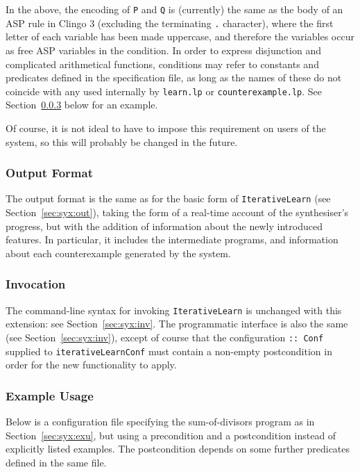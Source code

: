 \documentclass[a4paper,twoside,notitlepage,12pt]{article}
\begin{document}
In the above, the encoding of \verb|P| and \verb|Q| is (currently) the same as the body of an ASP rule in Clingo 3 (excluding the terminating 
\verb|.| character), where the first letter of each variable has been made uppercase, and therefore the variables occur as free ASP variables 
in the condition. In order to express disjunction and complicated arithmetical functions, conditions may refer to constants and predicates 
defined in the specification file, as long as the names of these do not coincide with any used internally by \verb|learn.lp| or 
\verb|counterexample.lp|. See Section~\ref{sec:gnx:exu} below for an example.

Of course, it is not ideal to have to impose this requirement on users of the system, so this will probably be changed in the future.

\subsubsection{Output Format} \label{sec:gnx:out}

The output format is the same as for the basic form of \verb|IterativeLearn| (see Section~\ref{sec:syx:out}), taking the form of a 
real-time account of the synthesiser's progress, but with the addition of information about the newly introduced features. In particular, it
includes the intermediate programs, and information about each counterexample generated by the system.

\subsubsection{Invocation} \label{sec:gnx:inv}

The command-line syntax for invoking \verb|IterativeLearn| is unchanged with this extension: see Section~\ref{sec:syx:inv}. The programmatic 
interface is also the same (see Section~\ref{sec:syx:inv}), except of course that the configuration \verb|:: Conf| supplied to 
\verb|iterativeLearnConf| must contain a non-empty postcondition in order for the new functionality to apply.

\subsubsection{Example Usage} \label{sec:gnx:exu}

Below is a configuration file specifying the sum-of-divisors program as in 
Section~\ref{sec:syx:exu}, but using a precondition and a postcondition instead of 
explicitly listed examples. The postcondition depends on some further predicates 
defined in the same file.
\end{document}
